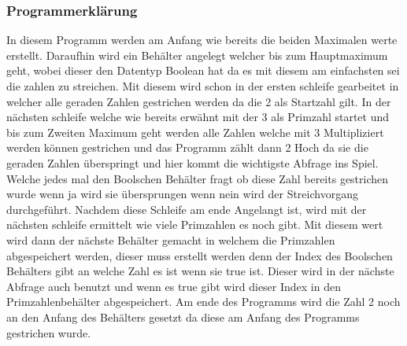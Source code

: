 \subsubsection{Programmerklärung}
In diesem Programm werden am Anfang wie bereits die beiden Maximalen werte erstellt. Daraufhin wird ein Behälter angelegt welcher bis zum Hauptmaximum geht, wobei dieser den Datentyp Boolean hat da es mit diesem am einfachsten sei die zahlen zu streichen. Mit diesem wird schon in der ersten schleife gearbeitet in welcher alle geraden Zahlen gestrichen werden da die 2 als Startzahl gilt. In der nächsten schleife welche wie bereits erwähnt mit der 3 als Primzahl startet und bis zum Zweiten Maximum geht werden alle Zahlen welche mit 3 Multipliziert werden können gestrichen und das Programm zählt dann 2 Hoch da sie die geraden Zahlen überspringt und hier kommt die wichtigste Abfrage ins Spiel. Welche  jedes mal den Boolschen Behälter fragt ob diese Zahl bereits gestrichen wurde wenn ja wird sie übersprungen wenn nein wird der Streichvorgang durchgeführt. Nachdem diese Schleife am ende Angelangt ist, wird mit der nächsten schleife ermittelt wie viele Primzahlen es noch gibt. Mit diesem wert wird dann der nächste Behälter gemacht in welchem die Primzahlen abgespeichert werden, dieser muss erstellt werden denn der Index des Boolschen Behälters gibt an welche Zahl es ist wenn sie true ist. Dieser wird in der nächste Abfrage auch benutzt und wenn es true gibt wird dieser Index in den Primzahlenbehälter abgespeichert.
Am ende des Programms wird die Zahl 2 noch an den Anfang des Behälters gesetzt da diese am Anfang des Programms gestrichen wurde.